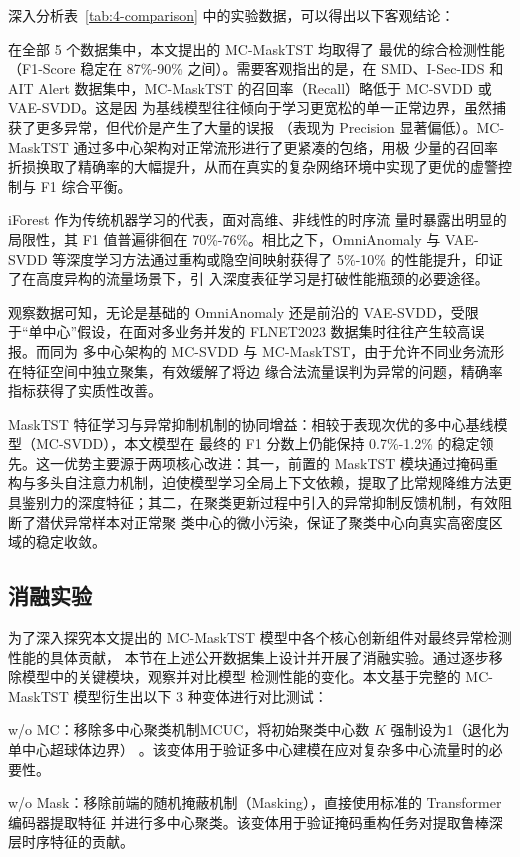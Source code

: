 深入分析表~\ref{tab:4-comparison} 中的实验数据，可以得出以下客观结论：

在全部 5 个数据集中，本文提出的 MC-MaskTST 均取得了
最优的综合检测性能（F1-Score 稳定在 87\%-90\% 之间）。需要客观指出的是，在 SMD、I-Sec-IDS 
和 AIT Alert 数据集中，MC-MaskTST 的召回率（Recall）略低于 MC-SVDD 或 VAE-SVDD。这是因
为基线模型往往倾向于学习更宽松的单一正常边界，虽然捕获了更多异常，但代价是产生了大量的误报
（表现为 Precision 显著偏低）。MC-MaskTST 通过多中心架构对正常流形进行了更紧凑的包络，用极
少量的召回率折损换取了精确率的大幅提升，从而在真实的复杂网络环境中实现了更优的虚警控制与 F1 综合平衡。

iForest 作为传统机器学习的代表，面对高维、非线性的时序流
量时暴露出明显的局限性，其 F1 值普遍徘徊在 70\%-76\%。相比之下，OmniAnomaly 与 VAE-SVDD 
等深度学习方法通过重构或隐空间映射获得了 5\%-10\% 的性能提升，印证了在高度异构的流量场景下，引
入深度表征学习是打破性能瓶颈的必要途径。

观察数据可知，无论是基础的 OmniAnomaly 还是前沿的 
VAE-SVDD，受限于“单中心”假设，在面对多业务并发的 FLNET2023 数据集时往往产生较高误报。而同为
多中心架构的 MC-SVDD 与 MC-MaskTST，由于允许不同业务流形在特征空间中独立聚集，有效缓解了将边
缘合法流量误判为异常的问题，精确率指标获得了实质性改善。

MaskTST 特征学习与异常抑制机制的协同增益：相较于表现次优的多中心基线模型（MC-SVDD），本文模型在
最终的 F1 分数上仍能保持 0.7\%-1.2\% 的稳定领先。这一优势主要源于两项核心改进：其一，前置的 
MaskTST 模块通过掩码重构与多头自注意力机制，迫使模型学习全局上下文依赖，提取了比常规降维方法更
具鉴别力的深度特征；其二，在聚类更新过程中引入的异常抑制反馈机制，有效阻断了潜伏异常样本对正常聚
类中心的微小污染，保证了聚类中心向真实高密度区域的稳定收敛。

\subsection{消融实验}
为了深入探究本文提出的 MC-MaskTST 模型中各个核心创新组件对最终异常检测性能的具体贡献，
本节在上述公开数据集上设计并开展了消融实验。通过逐步移除模型中的关键模块，观察并对比模型
检测性能的变化。本文基于完整的 MC-MaskTST 模型衍生出以下 3 种变体进行对比测试：

w/o MC：移除多中心聚类机制MCUC，将初始聚类中心数 $K$ 强制设为1（退化为单中心超球体边界）
。该变体用于验证多中心建模在应对复杂多中心流量时的必要性。

w/o Mask：移除前端的随机掩蔽机制（Masking），直接使用标准的 Transformer 编码器提取特征
并进行多中心聚类。该变体用于验证掩码重构任务对提取鲁棒深层时序特征的贡献。

